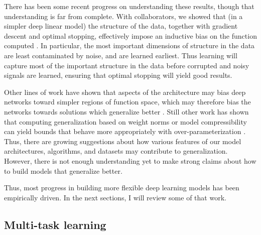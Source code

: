 There has been some recent progress on understanding these results, though that understanding is far from complete. With collaborators, we showed that (in a simpler deep linear model) the structure of the data, together with gradient descent and optimal stopping, effectively impose an inductive bias on the function computed \citep{Lampinen2019}. In particular, the most important dimensions of structure in the data are least contaminated by noise, and are learned earliest. Thus learning will capture most of the important structure in the data before corrupted and noisy signals are learned, ensuring that optimal stopping will yield good results. \par
Other lines of work have shown that aspects of the architecture may bias deep networks toward simpler regions of function space, which may therefore bias the networks towards solutions which generalize better \citep{Perez2019}. Still other work has shown that computing generalization based on weight norms or model compressibility can yield bounds that behave more appropriately with over-parameterization \citep{Neyshabur2018,Arora2018}. Thus, there are growing suggestions about how various features of our model architectures, algorithms, and datasets may contribute to generalization. However, there is not enough understanding yet to make strong claims about how to build models that generalize better. \par 
Thus, most progress in building more flexible deep learning models has been empirically driven. In the next sections, I will review some of that work. 

\subsection{Multi-task learning}

